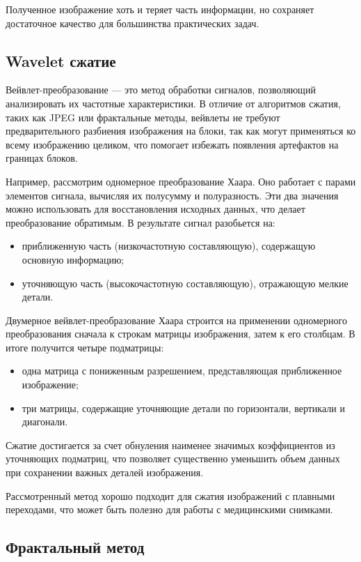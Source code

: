Полученное изображение хоть и теряет часть информации, но сохраняет достаточное качество для большинства практических задач.


\subsection{Wavelet сжатие}

Вейвлет-преобразование \cite{WaveletCompression} --- это метод обработки сигналов, позволяющий анализировать их частотные характеристики. В отличие от алгоритмов сжатия, таких как JPEG или фрактальные методы, вейвлеты не требуют предварительного разбиения изображения на блоки, так как могут применяться ко всему изображению целиком, что помогает избежать появления артефактов на границах блоков.

Например, рассмотрим одномерное преобразование Хаара. Оно работает с парами элементов сигнала, вычисляя их полусумму и полуразность. Эти два значения можно использовать для восстановления исходных данных, что делает преобразование обратимым. В результате сигнал разобьется на:
\begin{itemize}
    \item приближенную часть (низкочастотную составляющую), содержащую основную информацию;
    \item уточняющую часть (высокочастотную составляющую), отражающую мелкие детали.
\end{itemize}

Двумерное вейвлет-преобразование Хаара строится на применении одномерного преобразования сначала к строкам матрицы изображения, затем к его столбцам. В итоге получится четыре подматрицы:
\begin{itemize}
    \item одна матрица с пониженным разрешением, представляющая приближенное изображение;
    \item три матрицы, содержащие уточняющие детали по горизонтали, вертикали и диагонали.
\end{itemize}

Сжатие достигается за счет обнуления наименее значимых коэффициентов из уточняющих подматриц, что позволяет существенно уменьшить объем данных при сохранении важных деталей изображения.

Рассмотренный метод хорошо подходит для сжатия изображений с плавными переходами, что может быть полезно для работы с медицинскими снимками.


\subsection{Фрактальный метод}

